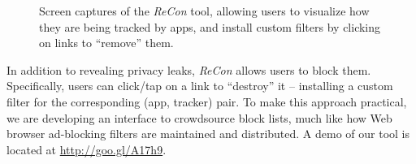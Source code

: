 \begin{figure}[tb]
\hspace{0.1in}
\caption{Screen captures of the \emph{ReCon} tool, allowing users to visualize how they are being tracked by apps, and install custom filters by clicking on links to ``remove'' them. }
\label{fig:recon}
\vspace{\postfigspace}
\end{figure}

In addition to revealing privacy leaks, \emph{ReCon} allows users to block them. Specifically, users can 
click/tap on a link to ``destroy'' it -- installing a custom 
filter for the corresponding (app, tracker) pair. To make this approach practical, we are developing 
an interface to crowdsource block lists, much like how Web browser ad-blocking filters are maintained 
and distributed. A demo of our tool is located at \url{http://goo.gl/A17h9}. 

